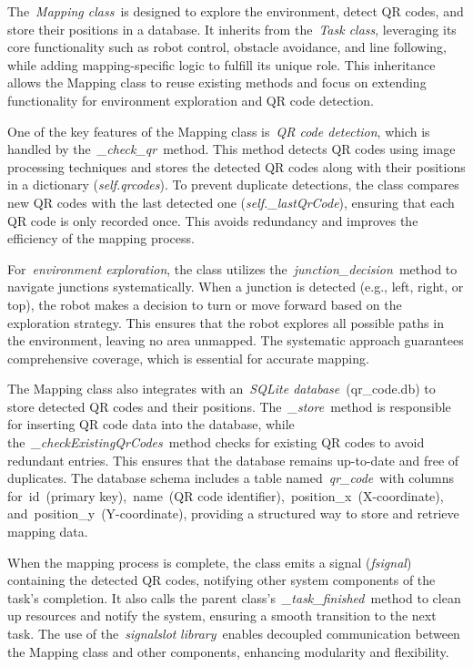 \documentclass[a4paper,12pt]{extreport}
\begin{document}
The~\emph{Mapping class}~is designed to explore the environment, detect
QR codes, and store their positions in a database. It inherits from
the~\emph{Task class}, leveraging its core functionality such as robot
control, obstacle avoidance, and line following, while adding
mapping-specific logic to fulfill its unique role. This inheritance
allows the Mapping class to reuse existing methods and focus on
extending functionality for environment exploration and QR code
detection.

One of the key features of the Mapping class is~\emph{QR code
detection}, which is handled by the~\emph{\_check\_qr}~method. This
method detects QR codes using image processing techniques and stores the
detected QR codes along with their positions in a dictionary
(\emph{self.qrcodes}). To prevent duplicate detections, the class
compares new QR codes with the last detected one
(\emph{self.\_lastQrCode}), ensuring that each QR code is only recorded
once. This avoids redundancy and improves the efficiency of the mapping
process.

For~\emph{environment exploration}, the class utilizes
the~\emph{junction\_decision}~method to navigate junctions
systematically. When a junction is detected (e.g., left, right, or top),
the robot makes a decision to turn or move forward based on the
exploration strategy. This ensures that the robot explores all possible
paths in the environment, leaving no area unmapped. The systematic
approach guarantees comprehensive coverage, which is essential for
accurate mapping.

The Mapping class also integrates with an~\emph{SQLite
database}~(qr\_code.db) to store detected QR codes and their positions.
The~\emph{\_store~}method is responsible for inserting QR code data into
the database, while the~\emph{\_checkExistingQrCodes}~method checks for
existing QR codes to avoid redundant entries. This ensures that the
database remains up-to-date and free of duplicates. The database schema
includes a table named~\emph{qr\_code}~with columns for~id~(primary
key),~name~(QR code identifier),~position\_x~(X-coordinate),
and~position\_y~(Y-coordinate), providing a structured way to store and
retrieve mapping data.

When the mapping process is complete, the class emits a signal
(\emph{fsignal}) containing the detected QR codes, notifying other
system components of the task's completion. It also calls the parent
class's~\emph{\_task\_finished}~method to clean up resources and notify
the system, ensuring a smooth transition to the next task. The use of
the~\emph{signalslot} \emph{library}~enables decoupled communication
between the Mapping class and other components, enhancing modularity and
flexibility.
\end{document}
